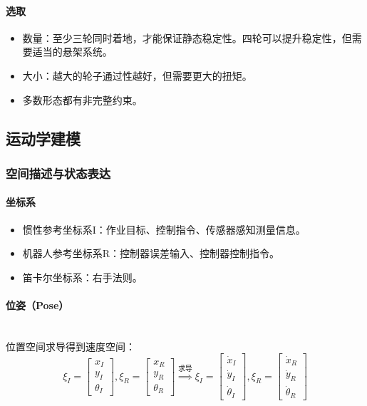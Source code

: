 \documentclass[
12pt, %
a4paper, 
oneside, %
headinclude,footinclude, %
]{scrartcl}
\begin{document}
\paragraph{选取}
\begin{itemize}
\item 数量：至少三轮同时着地，才能保证静态稳定性。四轮可以提升稳定性，但需要适当的悬架系统。
\item 大小：越大的轮子通过性越好，但需要更大的扭矩。
\item 多数形态都有非完整约束。
\end{itemize}
\subsection[运动学建模]{运动学建模}
\subsubsection[空间描述与状态表达]{空间描述与状态表达}
\paragraph{坐标系}
\begin{itemize}
\item 惯性参考坐标系I：作业目标、控制指令、传感器感知测量信息。
\item 机器人参考坐标系R：控制器误差输入、控制器控制指令。
\item 笛卡尔坐标系：右手法则。
\end{itemize}
\paragraph{位姿（Pose）}~\\

位置空间求导得到速度空间：
$$
\xi_I = \begin{bmatrix} x_I \\ y_I \\ \theta_I \end{bmatrix}, 
\xi_R = \begin{bmatrix} x_R \\ y_R \\ \theta_R \end{bmatrix}
\overset{\text{求导}}{\Longrightarrow}
\xi_I = \begin{bmatrix} \dot{x}_I \\ \dot{y}_I \\ \dot{\theta}_I \end{bmatrix},
\xi_R = \begin{bmatrix} \dot{x}_R \\ \dot{y}_R \\ \dot{\theta}_R \end{bmatrix}
$$
\end{document}
